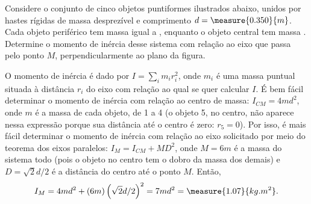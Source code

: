 \begin{question}
	Considere o conjunto de cinco objetos puntiformes ilustrados abaixo, unidos por hastes rígidas de massa desprezível e comprimento $d = \measure{0.350}{m}$.
	Cada objeto periférico tem massa igual a , enquanto o objeto central tem massa .
	Determine o momento de inércia desse sistema com relação ao eixo que passa pelo ponto $M$, perpendicularmente ao plano da figura.


	\begin{answer}
	\end{answer}

	\begin{solution}
		O momento de inércia é dado por $I = \sum_i m_i r_i^2$, onde $m_i$ é uma massa puntual situada à distância $r_i$ do eixo com relação ao qual se quer calcular $I$.
		É bem fácil determinar o momento de inércia com relação ao centro de massa: $I_{CM} = 4md^2$, onde $m$ é a massa de cada objeto, de 1 a 4 (o objeto 5, no centro, não aparece nessa expressão porque sua distância até o centro é zero: $r_5 = 0$).
		Por isso, é mais fácil determinar o momento de inércia com relação ao eixo solicitado por meio do teorema dos eixos paralelos: $I_M = I_{CM} + MD^2$, onde $M = 6m$ é a massa do sistema todo (pois o objeto no centro tem o dobro da massa dos demais) e $D = \sqrt{2}d/2$ é a distância do centro até o ponto $M$.
		Então,
		\begin{equation*}
			I_M = 4md^2 + (6m)\left(\sqrt{2}d/2\right)^2 = 7md^2 = \measure{1.07}{kg.m^2}.
		\end{equation*}
	\end{solution}
\end{question}

